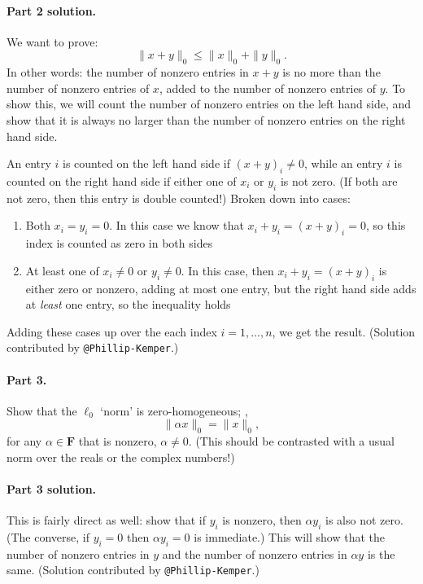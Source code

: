 \documentclass[12pt,hidelinks]{article}
\newcommand{\field}{\mathbf{F}}
\begin{document}
\begin{solution}
\paragraph{Part 2 solution.} We want to prove:
\[
 \|x + y\|_0 \le \|x\|_0 + \|y\|_0.
\]
In other words: the number of nonzero entries in $x+y$ is no more than the
number of nonzero entries of $x$, added to the number of nonzero entries of
$y$. To show this, we will count the number of nonzero entries on the left hand
side, and show that it is always no larger than the number of nonzero entries
on the right hand side.

An entry $i$ is counted on the left hand side if $(x+y)_i\ne 0$, while an entry
$i$ is counted on the right hand side if either one of $x_i$ or $y_i$ is not
zero. (If both are not zero, then this entry is double counted!) Broken
down into cases:
\begin{enumerate}
    \item Both $x_i = y_i = 0$. In this case we know that $x_i + y_i = (x +
        y)_i = 0$, so this index is counted as zero in both sides
    \item At least one of $x_i \ne 0$ or $y_i \ne 0$. In this case, then $x_i
        + y_i = (x + y)_i$ is either zero or nonzero, adding at most one
        entry, but the right hand side adds at \emph{least} one entry, so the
        inequality holds
\end{enumerate}
Adding these cases up over the each index $i=1, \dots, n$, we get the result.
(Solution contributed by \verb|@Phillip-Kemper|.)

\end{solution}

\paragraph{Part 3.} Show that the $\ell_0$ `norm' is zero-homogeneous; \ie,
\[
    \|\alpha x\|_0 = \|x\|_0,
\]
for any $\alpha \in \field$ that is nonzero, $\alpha \ne 0$. (This should be
contrasted with a usual norm over the reals or the complex numbers!)

\begin{solution}
\paragraph{Part 3 solution.} This is fairly direct as well: show that if $y_i$
is nonzero, then $\alpha y_i$ is also not zero. (The converse, if $y_i = 0$
then $\alpha y_i = 0$ is immediate.) This will show that the number of nonzero
entries in $y$ and the number of nonzero entries in $\alpha y$ is the same.
(Solution contributed by \verb|@Phillip-Kemper|.)
\end{solution}
\end{document}
